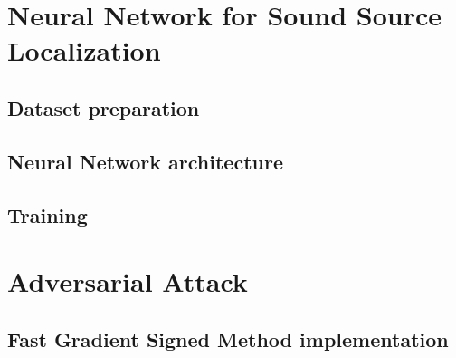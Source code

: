 \section{Neural Network for Sound Source Localization}

\subsection{Dataset preparation}

\subsection{Neural Network architecture}

\subsection{Training}

\section{Adversarial Attack}

\subsection{Fast Gradient Signed Method implementation}

